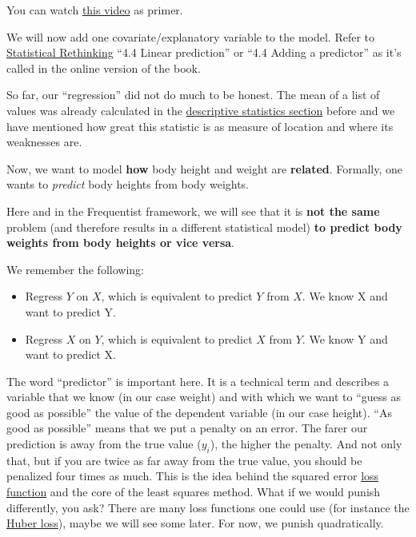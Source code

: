 \documentclass[
]{book}
\providecommand{\tightlist}{%
  \setlength{\itemsep}{0pt}\setlength{\parskip}{0pt}}
\begin{document}
You can watch \href{https://www.youtube.com/watch?v=14mkCpJ7tKs&ab_channel=VeryNormal}{this video} as primer.

We will now add one covariate/explanatory variable to the model.
Refer to \href{https://civil.colorado.edu/~balajir/CVEN6833/bayes-resources/RM-StatRethink-Bayes.pdf}{Statistical Rethinking}
``4.4 Linear prediction'' or ``4.4 Adding a predictor'' as it's called in the online version of the book.

So far, our ``regression'' did not do much to be honest. The mean of a list of values
was already calculated in the \href{https://jdegenfellner.github.io/Script_QM1_ZHAW/descriptive_stats.html}{descriptive statistics section}
before and we have mentioned how great this statistic is as measure of location and where its weaknesses are.

Now, we want to model \textbf{how} body height and weight are \textbf{related}.
Formally, one wants to \emph{predict} body heights from body weights.

Here and in the Frequentist framework, we will see that it is \textbf{not the same}
problem (and therefore results in a different statistical model)
\textbf{to predict body weights from body heights or vice versa}.

We remember the following:

\begin{itemize}
\tightlist
\item
  Regress \(Y\) on \(X\), which is equivalent to predict \(Y\) from \(X\).
  We know X and want to predict Y.
\item
  Regress \(X\) on \(Y\), which is equivalent to predict \(X\) from \(Y\).
  We know Y and want to predict X.
\end{itemize}

The word ``predictor'' is important here. It is a technical term
and describes a variable that we know (in our case weight) and with
which we want to ``guess as good as possible'' the value of the
dependent variable (in our case height). ``As good as possible''
means that we put a penalty on an error. The farer our prediction
is away from the true value (\(y_i\)), the higher the penalty.
And not only that, but if you are twice as far away from the true value,
you should be penalized four times as much. This is the idea behind
the squared error \href{https://en.wikipedia.org/wiki/Loss_function}{loss function}
and the core of the least squares method.
What if we would punish differently, you ask?
There are many loss functions one could use
(for instance the \href{https://en.wikipedia.org/wiki/Huber_loss}{Huber loss}),
maybe we will see some later. For now, we punish quadratically.
\end{document}
